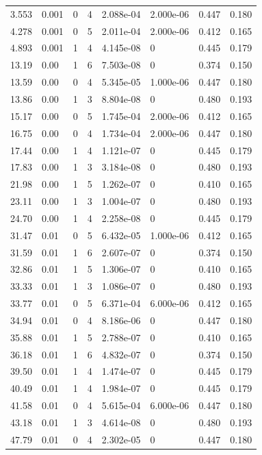 \documentclass[preview]{standalone}
\begin{document}
{{\begin{tabular}{L{1.2cm}C{1.2cm} C{0.3cm}C{0.5cm} C{1.4cm}C{1.4cm} C{1.4cm}C{1.4cm}}
  3.553  &  0.001  & 0     &  4 &  2.088e-04  & 2.000e-06  & 0.447 &  0.180   \\ 
  4.278  &  0.001  & 0     &  5 &  2.011e-04  & 2.000e-06  & 0.412 &  0.165   \\ 
  4.893  &  0.001  & 1     &  4 &  4.145e-08  & 0  & 0.445 &  0.179   \\ 
  13.19  &  0.00  & 1     &  6 &  7.503e-08  & 0  & 0.374 &  0.150   \\ 
  13.59  &  0.00  & 0     &  4 &  5.345e-05  & 1.000e-06  & 0.447 &  0.180   \\ 
  13.86  &  0.00  & 1     &  3 &  8.804e-08  & 0  & 0.480 &  0.193   \\ 
  15.17  &  0.00  & 0     &  5 &  1.745e-04  & 2.000e-06  & 0.412 &  0.165   \\ 
  16.75  &  0.00  & 0     &  4 &  1.734e-04  & 2.000e-06  & 0.447 &  0.180   \\ 
  17.44  &  0.00  & 1     &  4 &  1.121e-07  & 0  & 0.445 &  0.179   \\ 
  17.83  &  0.00  & 1     &  3 &  3.184e-08  & 0  & 0.480 &  0.193   \\ 
  21.98  &  0.00  & 1     &  5 &  1.262e-07  & 0  & 0.410 &  0.165   \\ 
  23.11  &  0.00  & 1     &  3 &  1.004e-07  & 0  & 0.480 &  0.193   \\ 
  24.70  &  0.00  & 1     &  4 &  2.258e-08  & 0  & 0.445 &  0.179   \\ 
  31.47  &  0.01  & 0     &  5 &  6.432e-05  & 1.000e-06  & 0.412 &  0.165   \\ 
  31.59  &  0.01  & 1     &  6 &  2.607e-07  & 0  & 0.374 &  0.150   \\ 
  32.86  &  0.01  & 1     &  5 &  1.306e-07  & 0  & 0.410 &  0.165   \\ 
  33.33  &  0.01  & 1     &  3 &  1.086e-07  & 0  & 0.480 &  0.193   \\ 
  33.77  &  0.01  & 0     &  5 &  6.371e-04  & 6.000e-06  & 0.412 &  0.165   \\ 
  34.94  &  0.01  & 0     &  4 &  8.186e-06  & 0  & 0.447 &  0.180   \\ 
  35.88  &  0.01  & 1     &  5 &  2.788e-07  & 0  & 0.410 &  0.165   \\ 
  36.18  &  0.01  & 1     &  6 &  4.832e-07  & 0  & 0.374 &  0.150   \\ 
  39.50  &  0.01  & 1     &  4 &  1.474e-07  & 0  & 0.445 &  0.179   \\ 
  40.49  &  0.01  & 1     &  4 &  1.984e-07  & 0  & 0.445 &  0.179   \\ 
  41.58  &  0.01  & 0     &  4 &  5.615e-04  & 6.000e-06  & 0.447 &  0.180   \\ 
  43.18  &  0.01  & 1     &  3 &  4.614e-08  & 0  & 0.480 &  0.193   \\ 
  47.79  &  0.01  & 0     &  4 &  2.302e-05  & 0  & 0.447 &  0.180   \\ 
\hline 
\end{tabular} 

}}
\end{document}
